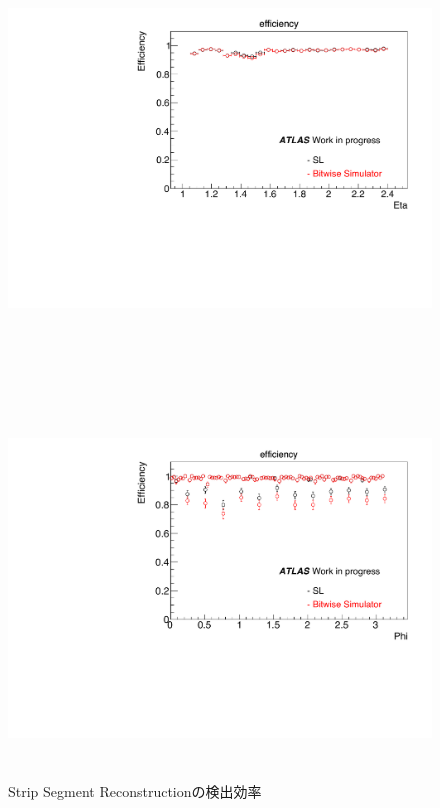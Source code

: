 \begin{figure}
\begin{minipage}[b]{\linewidth}
\centering
\includegraphics[height=10cm]{fig/Test/A_SM_wire_eta.pdf}
\end{minipage}\\
\begin{minipage}[b]{\linewidth}
\centering
\includegraphics[height=10cm]{fig/Test/A_SM_strip_phi.pdf}
\end{minipage}%
\caption[Strip Segment Reconstructionの検出効率]{Strip Segment Reconstructionの検出効率}
\label{SM_A_strip}
\end{figure}



